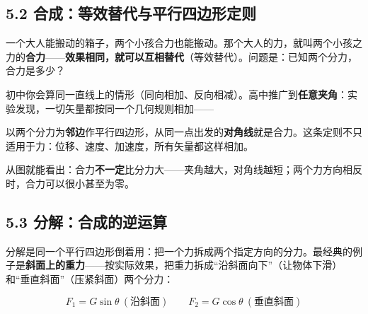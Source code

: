 \documentclass[UTF8,a4paper,11pt]{ctexart}
\begin{document}
\subsection*{5.2 合成：等效替代与平行四边形定则}

一个大人能搬动的箱子，两个小孩合力也能搬动。那个大人的力，就叫两个小孩之力的\textbf{合力}——\textbf{效果相同，就可以互相替代}（等效替代）。问题是：已知两个分力，合力是多少？

初中你会算同一直线上的情形（同向相加、反向相减）。高中推广到\textbf{任意夹角}：实验发现，一切矢量都按同一个几何规则相加——

\begin{keyconcept}[平行四边形定则]
以两个分力为\textbf{邻边}作平行四边形，从同一点出发的\textbf{对角线}就是合力。这条定则不只适用于力：位移、速度、加速度，所有矢量都这样相加。
\end{keyconcept}

\begin{center}
\end{center}

从图就能看出：合力\textbf{不一定}比分力大——夹角越大，对角线越短；两个力方向相反时，合力可以很小甚至为零。

\subsection*{5.3 分解：合成的逆运算}

分解是同一个平行四边形倒着用：把一个力拆成两个指定方向的分力。最经典的例子是\textbf{斜面上的重力}——按实际效果，把重力拆成“沿斜面向下”（让物体下滑）和“垂直斜面”（压紧斜面）两个分力：

\[
F_1 = G\sin\theta \ (\text{沿斜面}) \qquad F_2 = G\cos\theta \ (\text{垂直斜面})
\]
\end{document}
